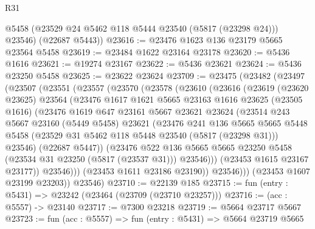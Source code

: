 \begin{lexlean}{R31}
\begin{coremodule}
        @5458
        (@23529 @24 @5462 @118 @5444 @23540 (@5817 (@23298 @24)))
        @23546)
      (@22687 @5443))
@23616 := @23476 @1623 @136 @23179 @5665 @23564 @5458
@23619 := @23484 @1622 @23164 @23178
@23620 := @5436 @1616
@23621 := @19274 @23167
@23622 := @5436 @23621
@23624 := @5436 @23250 @5458
@23625 := @23622 @23624
@23709 := @23475
    (@23482
      (@23497
        (@23507
          (@23551
            (@23557
              (@23570
                (@23578
                  (@23610
                    (@23616
                      (@23619
                        (@23620 @23625)
                        @23564
                        (@23476
                          @1617
                          @1621
                          @5665
                          @23163
                          @1616
                          @23625
                          (@23505 @1616)
                          (@23476
                            @1619
                            @647
                            @23161
                            @5667
                            @23621
                            @23624
                            (@23514
                              @243
                              @5667
                              @23160
                              (@5449 @5458)
                              @23621
                              (@23476
                                @241
                                @136
                                @5665
                                @5665
                                @5448
                                @5458
                                (@23529 @31 @5462 @118 @5448 @23540 (@5817 (@23298 @31)))
                                @23546)
                              (@22687 @5447))
                            (@23476
                              @522
                              @136
                              @5665
                              @5665
                              @23250
                              @5458
                              (@23534 @31 @23250 (@5817 (@23537 @31)))
                              @23546)))
                        (@23453 @1615 @23167 @23177))
                      @23546)))
                (@23453 @1611 @23186 @23190))
              @23546)))
        (@23453 @1607 @23199 @23203))
      @23546)
@23710 := @22139 @185
@23715 := fun (entry : @5431) => @23242 (@23464 (@23709 (@23710 @23257)))
@23716 := (acc : @5557) -> @23140
@23717 := @7300 @23218
@23719 := @5664 @23717 @5667
@23723 := fun (acc : @5557) => fun (entry : @5431) => @5664 @23719 @5665

\end{coremodule}
\end{lexlean}
